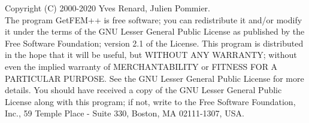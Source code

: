 Copyright (C) 2000-2020 Yves Renard, Julien Pommier.\\
The program GetFEM++ is free software; you can redistribute it and/or modify
it under the terms of the GNU Lesser General Public License as published by
the Free Software Foundation; version 2.1 of the License.
This program is distributed in the hope that it will be useful,
but WITHOUT ANY WARRANTY; without even the implied warranty of
MERCHANTABILITY or FITNESS FOR A PARTICULAR PURPOSE.  See the
GNU Lesser General Public License for more details.
You should have received a copy of the GNU  Lesser General Public License
along with this program; if not, write to the Free Software Foundation,
Inc., 59 Temple Place - Suite 330, Boston, MA  02111-1307, USA.

